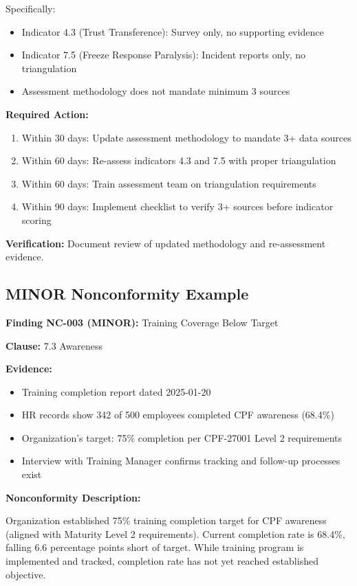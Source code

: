 \documentclass[11pt,a4paper]{article}
\begin{document}
Specifically:
\begin{itemize}
\item Indicator 4.3 (Trust Transference): Survey only, no supporting evidence
\item Indicator 7.5 (Freeze Response Paralysis): Incident reports only, no triangulation
\item Assessment methodology does not mandate minimum 3 sources
\end{itemize}

\textbf{Required Action:}

\begin{enumerate}
\item Within 30 days: Update assessment methodology to mandate 3+ data sources
\item Within 60 days: Re-assess indicators 4.3 and 7.5 with proper triangulation
\item Within 60 days: Train assessment team on triangulation requirements
\item Within 90 days: Implement checklist to verify 3+ sources before indicator scoring
\end{enumerate}

\textbf{Verification:} Document review of updated methodology and re-assessment evidence.

\subsection{MINOR Nonconformity Example}

\textbf{Finding NC-003 (MINOR):} Training Coverage Below Target

\textbf{Clause:} 7.3 Awareness

\textbf{Evidence:}
\begin{itemize}
\item Training completion report dated 2025-01-20
\item HR records show 342 of 500 employees completed CPF awareness (68.4\%)
\item Organization's target: 75\% completion per CPF-27001 Level 2 requirements
\item Interview with Training Manager confirms tracking and follow-up processes exist
\end{itemize}

\textbf{Nonconformity Description:}

Organization established 75\% training completion target for CPF awareness (aligned with Maturity Level 2 requirements). Current completion rate is 68.4\%, falling 6.6 percentage points short of target. While training program is implemented and tracked, completion rate has not yet reached established objective.
\end{document}
